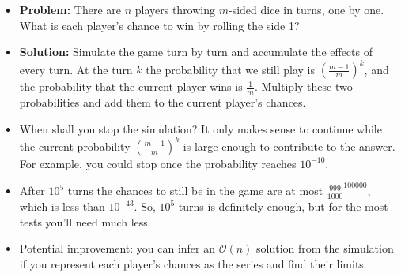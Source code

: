 \begin{frame}
    \frametitle{\problemtitle}
    \begin{itemize}
        \item<+-> \textbf{Problem:} There are $n$ players throwing $m$-sided dice in turns, one by one. What is each player's chance to win by rolling the side 1?
        \item<+-> \textbf{Solution:} Simulate the game turn by turn and accumulate the effects of every turn. At the turn $k$ the probability that we still play is $(\frac{m-1}{m})^k$, and the probability that the current player wins is $\frac{1}{m}$. Multiply these two probabilities and add them to the current player's chances.
        \item<+-> When shall you stop the simulation? It only makes sense to continue while the current probability $(\frac{m-1}{m})^k$ is large enough to contribute to the answer. For example, you could stop once the probability reaches $10^{-10}$.
        \item<+-> After $10^5$ turns the chances to still be in the game are at most ${\frac{999}{1000}}^{100000}$, which is less than $10^{-43}$. So, $10^5$ turns is definitely enough, but for the most tests you'll need much less.
        \item<+-> Potential improvement: you can infer an $\mathcal O(n)$ solution from the simulation if you represent each player's chances as the series and find their limits.
    \end{itemize}
\end{frame}
